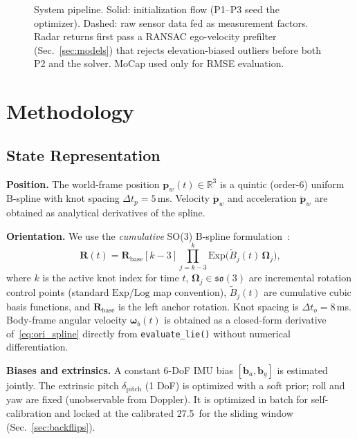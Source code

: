 \documentclass[conference]{IEEEtran}
\newcommand{\vR}{\mathbf{R}}
\newcommand{\vp}{\mathbf{p}}
\newcommand{\vom}{\boldsymbol{\omega}}
\newcommand{\vb}{\mathbf{b}}
\newcommand{\vOm}{\boldsymbol{\Omega}}
\newcommand{\so}{\mathfrak{so}(3)}
\newcommand{\Exp}{\mathrm{Exp}}
\newcommand{\Log}{\mathrm{Log}}
\begin{document}
\begin{figure}[t]
{%
}%
\caption{System pipeline. Solid: initialization flow (P1--P3 seed
the optimizer). Dashed: raw sensor data fed as measurement factors.
Radar returns first pass a RANSAC ego-velocity prefilter
(Sec.~\ref{sec:models}) that rejects elevation-biased outliers before
both P2 and the solver. MoCap used only for RMSE evaluation.}
\label{fig:pipeline}
\end{figure}

\section{Methodology}
\label{sec:method}

\subsection{State Representation}
\label{sec:state}

\textbf{Position.}
The world-frame position $\vp_w(t) \in \mathbb{R}^3$ is a quintic
(order-6) uniform B-spline with knot spacing $\Delta t_p = 5$\,ms.
Velocity $\dot{\vp}_w$ and acceleration $\ddot{\vp}_w$ are
obtained as analytical derivatives of the spline.

\textbf{Orientation.}
We use the \emph{cumulative} SO(3) B-spline
formulation~\cite{sommer2020efficient}:
\begin{equation}
  \vR(t) = \vR_{\mathrm{base}}[k{-}3]
           \prod_{j=k-3}^{k} \Exp\!\bigl(\tilde{B}_j(t)\,\vOm_j\bigr),
  \label{eq:ori_spline}
\end{equation}
where $k$ is the active knot index for time $t$,
$\vOm_j \in \so$ are incremental rotation control points
(standard $\Exp$/$\Log$ map convention),
$\tilde{B}_j(t)$ are cumulative cubic basis functions, and
$\vR_{\mathrm{base}}$ is the left anchor rotation.  Knot spacing
is $\Delta t_o = 8$\,ms.  Body-frame angular velocity $\vom_b(t)$
is obtained as a closed-form derivative of~\eqref{eq:ori_spline}
directly from \texttt{evaluate\_lie()} without numerical
differentiation.

\textbf{Biases and extrinsics.}
A constant 6-DoF IMU bias $[\vb_a, \vb_g]$ is estimated jointly.
The extrinsic pitch $\delta_\text{pitch}$ (1 DoF) is optimized
with a soft prior; roll and yaw are fixed (unobservable from
Doppler).  It is optimized in batch for self-calibration and locked at
the calibrated 27.5\degree\ for the sliding window
(Sec.~\ref{sec:backflips}).
\end{document}
